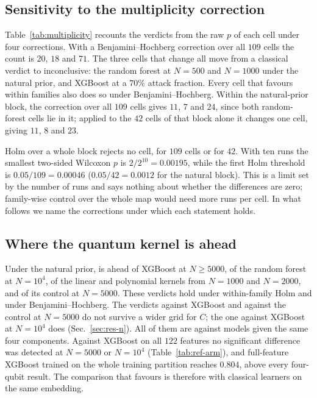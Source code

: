 \subsection{Sensitivity to the multiplicity correction}\label{sec:regime-mult}

Table~\ref{tab:multiplicity} recounts the verdicts from the raw $p$ of each cell under four
corrections. With a Benjamini--Hochberg correction over all $109$ cells the count is $20$, $18$
and $71$. The three cells that change all move from a classical verdict to inconclusive: the
random forest at $N=500$ and $N=1000$ under the natural prior, and XGBoost at a $70\%$ attack
fraction. Every cell that favours \QSVM{} within families also does so under
Benjamini--Hochberg. Within the natural-prior block, the correction over all $109$ cells gives
$11$, $7$ and $24$, since both random-forest cells lie in it; applied to the $42$ cells of that
block alone it changes one cell, giving $11$, $8$ and $23$.

Holm over a whole block rejects no cell, for $109$ cells or for $42$. With ten runs the smallest
two-sided Wilcoxon $p$ is $2/2^{10}=0.00195$, while the first Holm threshold is
$0.05/109=0.00046$ ($0.05/42=0.0012$ for the natural block). This is a limit set by the number
of runs and says nothing about whether the differences are zero; family-wise control over the
whole map would need more runs per cell. In what follows we name the corrections under which
each statement holds.

\subsection{Where the quantum kernel is ahead}

Under the natural prior, \QSVM{} is ahead of XGBoost at $N\geq5000$, of the random forest at
$N=10^4$, of the linear and polynomial kernels from $N=1000$ and $N=2000$, and of its \Zmap{}
control at $N=5000$. These verdicts hold under within-family Holm and under Benjamini--Hochberg.
The verdicts against XGBoost and against the \Zmap{} control at $N=5000$ do not survive a wider
grid for $C$; the one against XGBoost at $N=10^4$ does (Sec.~\ref{sec:res-n}). All of them are against models given the
same four components. Against XGBoost on all $122$ features no significant difference was
detected at $N=5000$ or $N=10^4$ (Table~\ref{tab:ref-arm}), and full-feature XGBoost trained on
the whole training partition reaches $0.804$, above every four-qubit result. The comparison that
favours \QSVM{} is therefore with classical learners on the same embedding.

